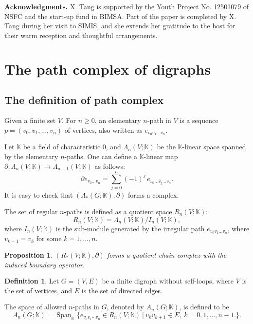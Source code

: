 \documentclass[11pt]{amsart}
\DeclareMathOperator{\Span}{Span}
\newcommand{\K}{\mathbb K}
\theoremstyle{plain}
\newtheorem{proposition}[theorem]{Proposition}
\theoremstyle{definition}
\newtheorem{definition}[theorem]{Definition}
\numberwithin{equation}{section}
\begin{document}
\vskip 0.2cm
\noindent\textbf{Acknowledgments.} X. Tang is supported by the Youth Project No. 12501079 of NSFC and the start-up fund in BIMSA. Part of the paper is completed by X. Tang during her visit to SIMIS, and she extends her gratitude to the host for their warm reception and thoughtful arrangements.

\bigskip
\section{The path complex of digraphs}\label{path}

\subsection{The definition of path complex}\label{sub:pathcpx}

Given a finite set $V$. For $n\geq 0$, an elementary $n$-path in $V$ is a sequence
$p=(v_0,v_1,\dots,v_n)$ of vertices, also written as $e_{v_0v_1\ldots v_n}$.  

Let $\K$ be a field of characteristic 0, and $\Lambda_n(V;\K)$ be the $\K$-linear space spanned by the elementary $n$-paths. One can define a $\K$-linear map $\partial:\Lambda_n(V;\K)\rightarrow \Lambda_{n-1}(V;\K)$ as follows:
\begin{equation}\label{eq:boundary}
\partial e_{v_0\dots v_n}=\sum_{j=0}^n (-1)^j\,e_{v_0\dots\widehat v_j\dots v_n}.
\end{equation}
It is easy to check that $(\Lambda_*(G;\K),\partial)$ forms a complex.

The set of regular $n$-paths is defined as a quotient space $R_n(V;\K)$:
$$R_n(V;\K)=\Lambda_n(V;\K)/I_n(V;\K),$$
where $I_n(V;\K)$ is the sub-module generated by the irregular path $e_{v_0v_1\ldots v_n}$, where $v_{k-1}=v_k$ for some $k=1,\ldots,n$. 
\begin{proposition}
$(R_*(V;\K),\partial)$ forms a quotient chain complex with the induced boundary operator.
\end{proposition}


\begin{definition}
Let $G=(V,E)$ be a finite digraph without self-loops, where $V$ is the set of vertices, and $E$ is the set of directed edges.

The space of allowed $n$-paths in $G$, denoted by $A_n(G;\K)$, is defined to be
$$A_n(G;\K)=\Span_{\K}\{e_{v_0v_1\cdots v_n}\in R_n(V;\K)~\big|~v_kv_{k+1}\in E, ~k=0,1,\ldots,n-1.\}.$$
\end{definition}
\end{document}
